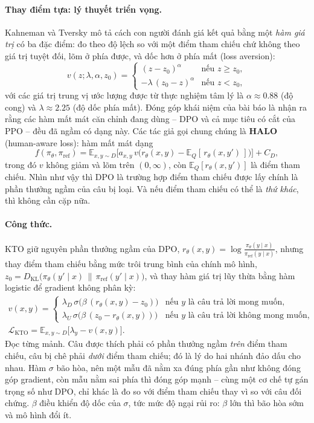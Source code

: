 \paragraph{Thay điểm tựa: lý thuyết triển vọng.} Kahneman và Tversky mô tả cách con người đánh giá kết quả bằng một \emph{hàm giá trị} có ba đặc điểm: đo theo độ lệch so với một điểm tham chiếu chứ không theo giá trị tuyệt đối, lõm ở phía được, và dốc hơn ở phía mất (loss aversion):
\[
    v(z; \lambda, \alpha, z_0) =
    \begin{cases}
        (z - z_0)^{\alpha} & \text{nếu } z \geq z_0, \\
        -\lambda\,(z_0 - z)^{\alpha} & \text{nếu } z < z_0,
    \end{cases}
\]
với các giá trị trung vị ước lượng được từ thực nghiệm tâm lý là \( \alpha \approx 0.88 \) (độ cong) và \( \lambda \approx 2.25 \) (độ dốc phía mất). Đóng góp khái niệm của bài báo là nhận ra rằng các hàm mất mát căn chỉnh đang dùng -- DPO và cả mục tiêu có cắt của PPO -- đều đã ngầm có dạng này. Các tác giả gọi chung chúng là \textbf{HALO} (human-aware loss): hàm mất mát dạng
\[
    f(\pi_{\theta}, \pi_{\text{ref}})
    = \mathbb{E}_{x,y \sim D}\Big[ a_{x,y}\, v\big( r_{\theta}(x,y) - \mathbb{E}_{Q}[\,r_{\theta}(x,y')\,] \big) \Big] + C_{D},
\]
trong đó \( v \) không giảm và lõm trên \( (0, \infty) \), còn \( \mathbb{E}_{Q}[r_{\theta}(x,y')] \) là điểm tham chiếu. Nhìn như vậy thì DPO là trường hợp điểm tham chiếu được lấy chính là phần thưởng ngầm của câu bị loại. Và nếu điểm tham chiếu có thể là \emph{thứ khác}, thì không cần cặp nữa.

\paragraph{Công thức.} KTO giữ nguyên phần thưởng ngầm của DPO, \( r_{\theta}(x,y) = \log\frac{\pi_{\theta}(y\mid x)}{\pi_{\text{ref}}(y\mid x)} \), nhưng thay điểm tham chiếu bằng mức trôi trung bình của chính mô hình, \( z_0 = D_{\text{KL}}\big(\pi_\theta(y'\mid x)\,\|\,\pi_{\text{ref}}(y'\mid x)\big) \), và thay hàm giá trị lũy thừa bằng hàm logistic để gradient không phân kỳ:
\[
\begin{gathered}
v(x,y) = \begin{cases}
\lambda_D\, \sigma\big(\beta\,(r_\theta(x,y) - z_0)\big) & \text{nếu } y \text{ là câu trả lời mong muốn},\\
\lambda_U\, \sigma\big(\beta\,(z_0 - r_\theta(x,y))\big) & \text{nếu } y \text{ là câu trả lời không mong muốn},
\end{cases}\\[6pt]
\mathcal{L}_{\text{KTO}} = \mathbb{E}_{x,y \sim D}\big[\lambda_y - v(x,y)\big].
\end{gathered}
\]
Đọc từng mảnh. Câu được thích phải có phần thưởng ngầm \emph{trên} điểm tham chiếu, câu bị chê phải \emph{dưới} điểm tham chiếu; đó là lý do hai nhánh đảo dấu cho nhau. Hàm \( \sigma \) bão hòa, nên một mẫu đã nằm xa đúng phía gần như không đóng góp gradient, còn mẫu nằm sai phía thì đóng góp mạnh -- cùng một cơ chế tự gán trọng số như DPO, chỉ khác là đo so với điểm tham chiếu thay vì so với câu đối chứng. \( \beta \) điều khiển độ dốc của \( \sigma \), tức mức độ ngại rủi ro: \( \beta \) lớn thì bão hòa sớm và mô hình đổi ít.

